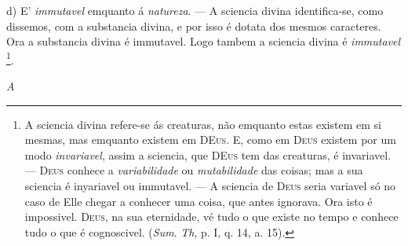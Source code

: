 d) E' \emph{immutavel} emquanto á \emph{natureza}. --- A sciencia divina identifica-se, como dissemos, com a substancia divina, e por isso é dotata dos mesmos caracteres. Ora a substancia divina é immutavel. Logo tambem a sciencia divina é \emph{immutavel} \footnote{A sciencia divina refere-se ás creaturas, não emquanto estas existem em si mesmas, mas emquanto existem em \textsc{DEus}. E, como em \textsc{Deus} existem por um modo \emph{invariavel}, assim a sciencia, que \textsc{DEus} tem das creaturas, é invariavel. --- \textsc{Deus} conhece a \emph{variabilidade} ou \emph{mutabilidade} das coisas; mas a sua sciencia é inyariavel ou immutavel. --- A sciencia de \textsc{Deus} seria variavel só no caso de Elle chegar a conhecer uma coisa, que antes ignorava. Ora isto é impossivel. \textsc{Deus}, na sua eternidade, vé tudo o que existe no tempo e conhece tudo o que é cognoscivel. (\emph{Sum}. \emph{Th}, p. I, q. 14, a. 15).}.

\emph{A}

